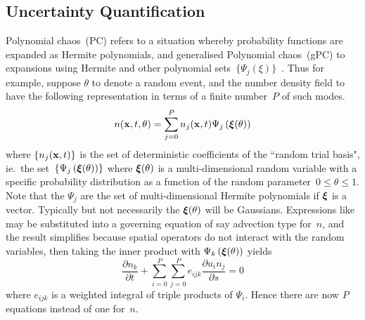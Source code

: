 \subsection{Uncertainty Quantification}\label{sec:sys23UQ}
Polynomial chaos~(PC) refers to a situation whereby probability
functions are expanded as Hermite polynomials, and generalised
Polynomial chaos~(gPC) to expansions using Hermite and other
polynomial sets~$\{\Psi_j(\xi)\}$~\cite{Xi03Mode}.
Thus for example, suppose $\theta$ to denote a random event, and the number density field
to have the following representation in terms of a finite number~$P$ of such modes.
\begin{equation}\label{eq:TrepgPC}
n({\bf x},t, \theta) = \sum_{j=0}^P n_j({\bf x},t) \Psi_j \left(\mbox{\boldmath $\xi$}(\theta)\right)
\end{equation}
where
$\{ n_j({\bf x},t)\}$ is the set of deterministic coefficients of the ``random trial basis",
ie.\ the set~$\{ \Psi_j \left(\mbox{\boldmath $\xi$}(\theta)\right) \}$ where $\mbox{\boldmath $\xi$}(\theta)$ 
is a multi-dimensional random variable with a specific 
probability distribution as a function of the random parameter~$0\leq\theta\leq 1$.
Note that the $\Psi_j$ are the set of multi-dimensional Hermite polynomials if $\mbox{\boldmath $\xi$}$ is a vector.
Typically but not necessarily the $\mbox{\boldmath $\xi$}(\theta)$ will be Gaussians.
Expressions like~ may be substituted into a governing
equation of say advection type for~$n$, and the result simplifies because spatial
operators do not interact with the random variables, then taking the inner product
with $\Psi_k \left(\mbox{\boldmath $\xi$}(\theta)\right)$ yields
\begin{equation}\label{eq:TgPC}
\frac{\partial n_k}{\partial t}+  
\sum_{i=0}^P \sum_{j=0}^P e_{ijk} \frac{\partial u_i n_j}{\partial s}=0
\end{equation}
where $e_{ijk}$ is a weighted integral of triple products of $\Psi_i$.
Hence there are now $P$ equations instead of one for~$n$.

